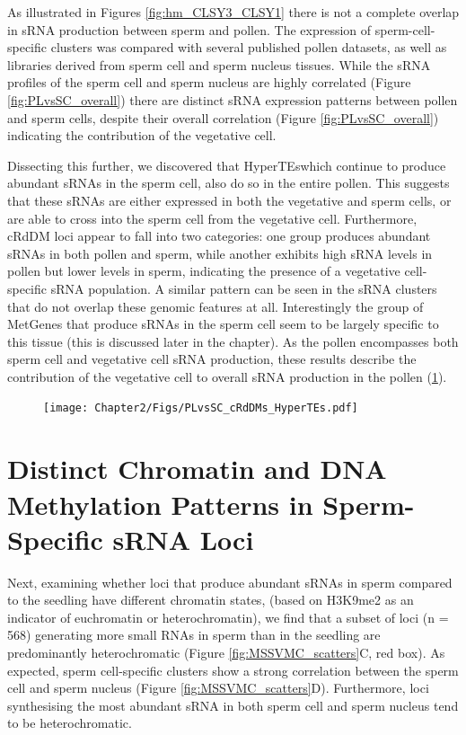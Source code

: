 As illustrated in Figures \ref{fig:hm_CLSY3_CLSY1} there is not a complete overlap in sRNA production between sperm and pollen. The expression of sperm-cell-specific clusters was compared with several published pollen datasets, as well as libraries derived from sperm cell and sperm nucleus tissues. While the sRNA profiles of the sperm cell and sperm nucleus are highly correlated (Figure \ref{fig:PLvsSC_overall}) there are distinct sRNA expression patterns between pollen and sperm cells, despite their overall correlation (Figure \ref{fig:PLvsSC_overall}) indicating the contribution of the vegetative cell. 

Dissecting this further, we discovered that HyperTEswhich continue to produce abundant sRNAs in the sperm cell, also do so in the entire pollen.  This suggests that these sRNAs are either expressed in both the vegetative and sperm cells, or are able to cross into the sperm cell from the vegetative cell. Furthermore, cRdDM loci appear to fall into two categories: one group produces abundant sRNAs in both pollen and sperm, while another exhibits high sRNA levels in pollen but lower levels in sperm, indicating the presence of a vegetative cell-specific sRNA population. A similar pattern can be seen in the sRNA clusters that do not overlap these genomic features at all. Interestingly the group of MetGenes that produce sRNAs in the sperm cell seem to be  largely specific to this tissue (this is discussed later in the chapter). As the pollen encompasses both sperm cell and vegetative cell sRNA production, these results describe the contribution of the vegetative cell to overall sRNA production in the pollen (\ref{fig:PLvSC_cRdDMs}).

\begin{figure}[htbp!] 
\centering    
    \texttt{[image: Chapter2/Figs/PLvsSC\_cRdDMs\_HyperTEs.pdf]}
\caption{\textbf{}}
\label{fig:PLvSC_cRdDMs}
\captionsetup{font=small}
    \caption*{}
\end{figure}

\section{Distinct Chromatin and DNA Methylation Patterns in Sperm-Specific sRNA Loci}

Next, examining whether loci that produce abundant sRNAs in sperm compared to the seedling have different chromatin states, (based on H3K9me2 as an indicator of euchromatin or heterochromatin), we find that a subset of loci (n = 568) generating more small RNAs in sperm than in the seedling are predominantly heterochromatic (Figure \ref{fig:MSSVMC_scatters}C, red box). As expected, sperm cell-specific clusters show a strong correlation between the sperm cell and sperm nucleus (Figure \ref{fig:MSSVMC_scatters}D). Furthermore, loci synthesising the most abundant sRNA in both sperm cell and sperm nucleus tend to be heterochromatic.

